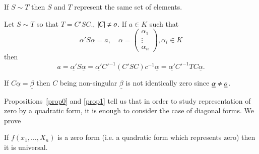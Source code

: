 \begin{prop}\label{prop1}
If $S\sim T$ then $S$ and $T$ represent the same set of elements.
\end{prop}


\begin{Proof}
Let $S\sim T$ so that $T=C'SC.$, $|C|\neq o$. If $a\in K$ such
that 
\begin{equation*}
\alpha' S \underline{\alpha}=a, \quad
\alpha=\begin{pmatrix}\alpha_1\\\vdots\\\alpha_n\end{pmatrix},
\alpha_i\in K 
\end{equation*}
then
\begin{equation*}
a=\underline{\alpha'} S\underline{\alpha} = \underline{\alpha'}
C'^{-1} (C' SC)c^{-1}\underline{\alpha}=\underline{\alpha'} C'^{-1} TC\underline{\alpha}.
\end{equation*}

If $C\underline{\alpha}=\underline{\beta}$ then $C$ being non-singular
$\underline{\beta}$ is not identically zero since $\underline{\alpha}
\neq \underline{o}$.

Propositions~\ref{prop0} and \ref{prop1} tell us that in order to study representation
of zero by a quadratic form, it is enough to consider the case of
diagonal forms. We prove
\enprf
\end{Proof}


\begin{prop}\label{prop2}
If $f(x_1,\ldots,X_n)$ is a zero form (i.e. a quadratic form which
represents zero) then it is universal.
\end{prop}


